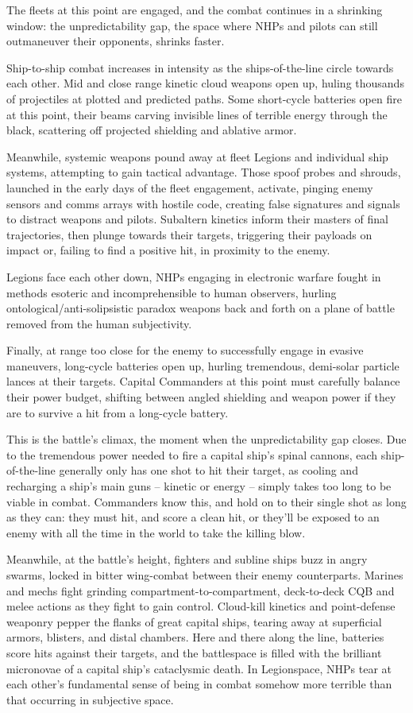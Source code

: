 The fleets at this point are engaged, and the combat continues in a shrinking window: the
unpredictability gap, the space where NHPs and pilots can still outmaneuver their opponents,
shrinks faster.

Ship-to-ship combat increases in intensity as the ships-of-the-line circle towards each other. Mid
and close range kinetic cloud weapons open up, huling thousands of projectiles at plotted and
predicted paths. Some short-cycle batteries open fire at this point, their beams carving invisible
lines of terrible energy through the black, scattering off projected shielding and ablative armor.

Meanwhile, systemic weapons pound away at fleet Legions and individual ship systems,
attempting to gain tactical advantage. Those spoof probes and shrouds, launched in the early
days of the fleet engagement, activate, pinging enemy sensors and comms arrays with hostile
code, creating false signatures and signals to distract weapons and pilots. Subaltern kinetics
inform their masters of final trajectories, then plunge towards their targets, triggering their
payloads on impact or, failing to find a positive hit, in proximity to the enemy.

Legions face each other down, NHPs engaging in electronic warfare fought in methods esoteric
and incomprehensible to human observers, hurling ontological/anti-solipsistic paradox weapons
back and forth on a plane of battle removed from the human subjectivity.

Finally, at range too close for the enemy to successfully engage in evasive maneuvers, long-cycle
batteries open up, hurling tremendous, demi-solar particle lances at their targets. Capital
Commanders at this point must carefully balance their power budget, shifting between angled
shielding and weapon power if they are to survive a hit from a long-cycle battery.

This is the battle’s climax, the moment when the unpredictability gap closes. Due to the
tremendous power needed to fire a capital ship’s spinal cannons, each ship-of-the-line generally
only has one shot to hit their target, as cooling and recharging a ship’s main guns -- kinetic or
energy -- simply takes too long to be viable in combat. Commanders know this, and hold on to
their single shot as long as they can: they must hit, and score a clean hit, or they’ll be exposed to
an enemy with all the time in the world to take the killing blow.

Meanwhile, at the battle’s height, fighters and subline ships buzz in angry swarms, locked in
bitter wing-combat between their enemy counterparts. Marines and mechs fight grinding
compartment-to-compartment, deck-to-deck CQB and melee actions as they fight to gain
control. Cloud-kill kinetics and point-defense weaponry pepper the flanks of great capital ships,
tearing away at superficial armors, blisters, and distal chambers. Here and there along the line,
batteries score hits against their targets, and the battlespace is filled with the brilliant micronovae
of a capital ship’s cataclysmic death. In Legionspace, NHPs tear at each other’s fundamental
sense of being in combat somehow more terrible than that occurring in subjective space.

